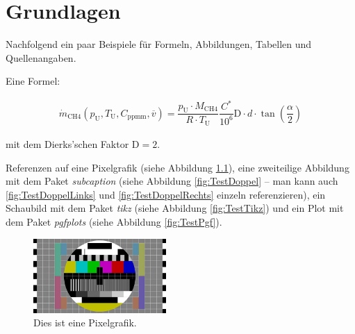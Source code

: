 
\chapter{Grundlagen}

Nachfolgend ein paar Beispiele für Formeln, Abbildungen, Tabellen und Quellenangaben.

Eine Formel:

\begin{align}
	\dot{m}_\mathrm{CH4} \left( p_\mathrm{U}, T_\mathrm{U}, C_\mathrm{ppmm}, \overline{v} \right) = \dfrac{p_\mathrm{U} \cdot M_\mathrm{CH4}}{R \cdot T_\mathrm{U}} \dfrac{C^{*}}{\num{10}^{\num{6}}} \mathrm{D} \cdot d \cdot \tan \left( \dfrac{\alpha}{2} \right)
	\label{eq:DierksscheFormel}
\end{align}

mit dem Dierks'schen Faktor $\mathrm{D} = \num{2}$.


Referenzen auf eine Pixelgrafik (siehe Abbildung \ref{fig:TestPixel}),
eine zweiteilige Abbildung mit dem Paket \textit{subcaption} (siehe
Abbildung \ref{fig:TestDoppel} -- man kann auch
\ref{fig:TestDoppelLinks} und \ref{fig:TestDoppelRechts} einzeln
referenzieren), ein Schaubild mit dem Paket \textit{tikz} (siehe
Abbildung \ref{fig:TestTikz}) und ein Plot mit dem Paket
\textit{pgfplots} (siehe Abbildung \ref{fig:TestPgf}).

\begin{figure}[!htbp]
	\centering
	\includegraphics[width=0.45\textwidth]{Bilder/Testbild}
	\caption{Dies ist eine Pixelgrafik.}
	\label{fig:TestPixel}
\end{figure}

